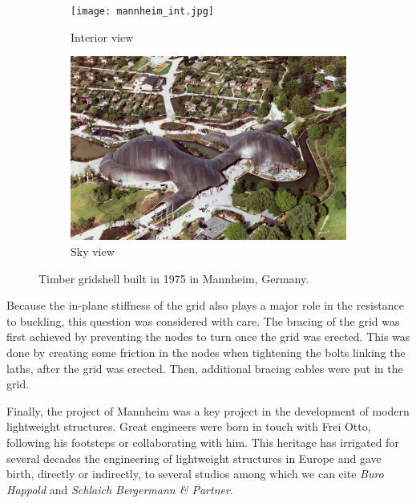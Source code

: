 \begin{figure}[t]
	\begin{subfigure}[b]{\TwoMediaWidth}
		\texttt{[image: mannheim\_int.jpg]}
		\caption{Interior view}
		\label{fig:mannheim_a}
	\end{subfigure}%
	\hspace{\MediaGutterWidth}%
	\begin{subfigure}[b]{\TwoMediaWidth}
		\includegraphics[width=\textwidth]{mannheim_sky.jpg}
		\caption{Sky view}
		\label{fig:mannheim_b}
	\end{subfigure}
	\caption[Timber gridshell built in 1962 in Essen, Germany]{Timber gridshell built in 1975 in Mannheim, Germany.}
	\label{fig:mannheim}
\end{figure}

Because the in-plane stiffness of the grid also plays a major role in the resistance to buckling, this question was considered with care. The bracing of the grid was first achieved by preventing the nodes to turn once the grid was erected. This was done by creating some friction in the nodes when tightening the bolts linking the laths, after the grid was erected. Then, additional bracing cables were put in the grid.

Finally, the project of Mannheim was a key project in the development of modern lightweight structures. Great engineers were born in touch with Frei Otto, following his footsteps or collaborating with him. This heritage has irrigated for several decades the engineering of lightweight structures in Europe and gave birth, directly or indirectly, to several studios among which we can cite \emph{Buro Happold} and \emph{Schlaich Bergermann \& Partner}.

